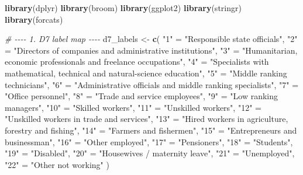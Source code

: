 \documentclass[
]{article}
\newenvironment{Shaded}{\begin{snugshade}}{\end{snugshade}}
\newcommand{\CommentTok}[1]{\textcolor[rgb]{0.56,0.35,0.01}{\textit{#1}}}
\newcommand{\FunctionTok}[1]{\textcolor[rgb]{0.13,0.29,0.53}{\textbf{#1}}}
\newcommand{\NormalTok}[1]{#1}
\newcommand{\OtherTok}[1]{\textcolor[rgb]{0.56,0.35,0.01}{#1}}
\newcommand{\StringTok}[1]{\textcolor[rgb]{0.31,0.60,0.02}{#1}}
\begin{document}
\begin{Shaded}
\begin{Highlighting}[]
\FunctionTok{library}\NormalTok{(dplyr)}
\FunctionTok{library}\NormalTok{(broom)}
\FunctionTok{library}\NormalTok{(ggplot2)}
\FunctionTok{library}\NormalTok{(stringr)}
\FunctionTok{library}\NormalTok{(forcats)}

\CommentTok{\# {-}{-}{-}{-} 1. D7 label map {-}{-}{-}{-}}
\NormalTok{d7\_labels }\OtherTok{\textless{}{-}} \FunctionTok{c}\NormalTok{(}
  \StringTok{"1"}  \OtherTok{=} \StringTok{"Responsible state officials"}\NormalTok{,}
  \StringTok{"2"}  \OtherTok{=} \StringTok{"Directors of companies and administrative institutions"}\NormalTok{,}
  \StringTok{"3"}  \OtherTok{=} \StringTok{"Humanitarian, economic professionals and freelance occupations"}\NormalTok{,}
  \StringTok{"4"}  \OtherTok{=} \StringTok{"Specialists with mathematical, technical and natural{-}science education"}\NormalTok{,}
  \StringTok{"5"}  \OtherTok{=} \StringTok{"Middle ranking technicians"}\NormalTok{,}
  \StringTok{"6"}  \OtherTok{=} \StringTok{"Administrative officials and middle ranking specialists"}\NormalTok{,}
  \StringTok{"7"}  \OtherTok{=} \StringTok{"Office personnel"}\NormalTok{,}
  \StringTok{"8"}  \OtherTok{=} \StringTok{"Trade and service employees"}\NormalTok{,}
  \StringTok{"9"}  \OtherTok{=} \StringTok{"Low ranking managers"}\NormalTok{,}
  \StringTok{"10"} \OtherTok{=} \StringTok{"Skilled workers"}\NormalTok{,}
  \StringTok{"11"} \OtherTok{=} \StringTok{"Unskilled workers"}\NormalTok{,}
  \StringTok{"12"} \OtherTok{=} \StringTok{"Unskilled workers in trade and services"}\NormalTok{,}
  \StringTok{"13"} \OtherTok{=} \StringTok{"Hired workers in agriculture, forestry and fishing"}\NormalTok{,}
  \StringTok{"14"} \OtherTok{=} \StringTok{"Farmers and fishermen"}\NormalTok{,}
  \StringTok{"15"} \OtherTok{=} \StringTok{"Entrepreneurs and businessman"}\NormalTok{,}
  \StringTok{"16"} \OtherTok{=} \StringTok{"Other employed"}\NormalTok{,}
  \StringTok{"17"} \OtherTok{=} \StringTok{"Pensioners"}\NormalTok{,}
  \StringTok{"18"} \OtherTok{=} \StringTok{"Students"}\NormalTok{,}
  \StringTok{"19"} \OtherTok{=} \StringTok{"Disabled"}\NormalTok{,}
  \StringTok{"20"} \OtherTok{=} \StringTok{"Housewives / maternity leave"}\NormalTok{,}
  \StringTok{"21"} \OtherTok{=} \StringTok{"Unemployed"}\NormalTok{,}
  \StringTok{"22"} \OtherTok{=} \StringTok{"Other not working"}
\NormalTok{)}


\end{Highlighting}
\end{Shaded}
\end{document}
